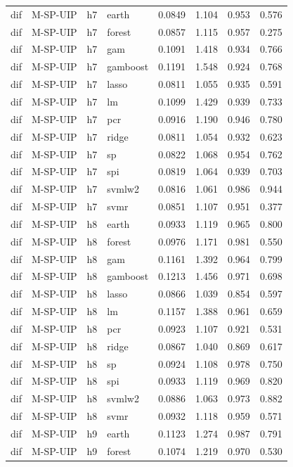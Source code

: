 \begin{ThreePartTable}
\begin{longtable}[t]{llclcccc}
dif & M-SP-UIP & h7 & earth & 0.0849 & 1.104 & 0.953 & 0.576\\
dif & M-SP-UIP & h7 & forest & 0.0857 & 1.115 & 0.957 & 0.275\\
dif & M-SP-UIP & h7 & gam & 0.1091 & 1.418 & 0.934 & 0.766\\
dif & M-SP-UIP & h7 & gamboost & 0.1191 & 1.548 & 0.924 & 0.768\\
dif & M-SP-UIP & h7 & lasso & 0.0811 & 1.055 & 0.935 & 0.591\\
dif & M-SP-UIP & h7 & lm & 0.1099 & 1.429 & 0.939 & 0.733\\
dif & M-SP-UIP & h7 & pcr & 0.0916 & 1.190 & 0.946 & 0.780\\
dif & M-SP-UIP & h7 & ridge & 0.0811 & 1.054 & 0.932 & 0.623\\
dif & M-SP-UIP & h7 & sp & 0.0822 & 1.068 & 0.954 & 0.762\\
dif & M-SP-UIP & h7 & spi & 0.0819 & 1.064 & 0.939 & 0.703\\
dif & M-SP-UIP & h7 & svmlw2 & 0.0816 & 1.061 & 0.986 & 0.944\\
dif & M-SP-UIP & h7 & svmr & 0.0851 & 1.107 & 0.951 & 0.377\\
\addlinespace
dif & M-SP-UIP & h8 & earth & 0.0933 & 1.119 & 0.965 & 0.800\\
dif & M-SP-UIP & h8 & forest & 0.0976 & 1.171 & 0.981 & 0.550\\
dif & M-SP-UIP & h8 & gam & 0.1161 & 1.392 & 0.964 & 0.799\\
dif & M-SP-UIP & h8 & gamboost & 0.1213 & 1.456 & 0.971 & 0.698\\
dif & M-SP-UIP & h8 & lasso & 0.0866 & 1.039 & 0.854 & 0.597\\
dif & M-SP-UIP & h8 & lm & 0.1157 & 1.388 & 0.961 & 0.659\\
dif & M-SP-UIP & h8 & pcr & 0.0923 & 1.107 & 0.921 & 0.531\\
dif & M-SP-UIP & h8 & ridge & 0.0867 & 1.040 & 0.869 & 0.617\\
dif & M-SP-UIP & h8 & sp & 0.0924 & 1.108 & 0.978 & 0.750\\
dif & M-SP-UIP & h8 & spi & 0.0933 & 1.119 & 0.969 & 0.820\\
dif & M-SP-UIP & h8 & svmlw2 & 0.0886 & 1.063 & 0.973 & 0.882\\
dif & M-SP-UIP & h8 & svmr & 0.0932 & 1.118 & 0.959 & 0.571\\
\addlinespace
dif & M-SP-UIP & h9 & earth & 0.1123 & 1.274 & 0.987 & 0.791\\
dif & M-SP-UIP & h9 & forest & 0.1074 & 1.219 & 0.970 & 0.530\\

\end{longtable}
\end{ThreePartTable}
